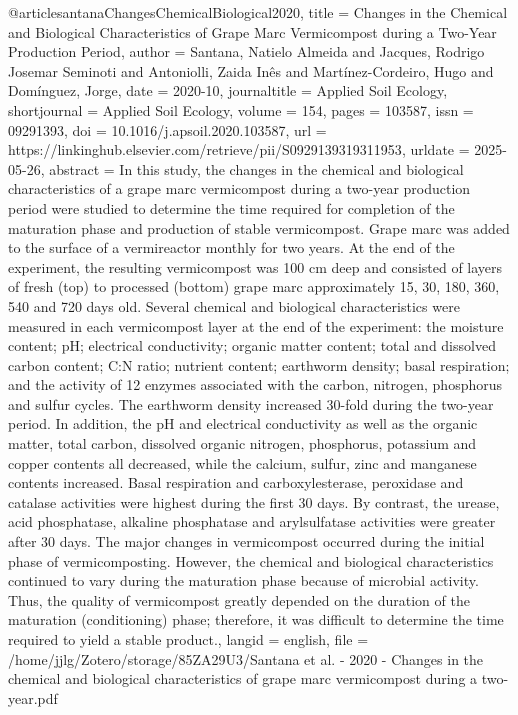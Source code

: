 {{{{@article{santanaChangesChemicalBiological2020,
  title = {Changes in the Chemical and Biological Characteristics of Grape Marc Vermicompost during a Two-Year Production Period},
  author = {Santana, Natielo Almeida and Jacques, Rodrigo Josemar Seminoti and Antoniolli, Zaida Inês and Martínez-Cordeiro, Hugo and Domínguez, Jorge},
  date = {2020-10},
  journaltitle = {Applied Soil Ecology},
  shortjournal = {Applied Soil Ecology},
  volume = {154},
  pages = {103587},
  issn = {09291393},
  doi = {10.1016/j.apsoil.2020.103587},
  url = {https://linkinghub.elsevier.com/retrieve/pii/S0929139319311953},
  urldate = {2025-05-26},
  abstract = {In this study, the changes in the chemical and biological characteristics of a grape marc vermicompost during a two-year production period were studied to determine the time required for completion of the maturation phase and production of stable vermicompost. Grape marc was added to the surface of a vermireactor monthly for two years. At the end of the experiment, the resulting vermicompost was 100 cm deep and consisted of layers of fresh (top) to processed (bottom) grape marc approximately 15, 30, 180, 360, 540 and 720 days old. Several chemical and biological characteristics were measured in each vermicompost layer at the end of the experiment: the moisture content; pH; electrical conductivity; organic matter content; total and dissolved carbon content; C:N ratio; nutrient content; earthworm density; basal respiration; and the activity of 12 enzymes associated with the carbon, nitrogen, phosphorus and sulfur cycles. The earthworm density increased 30-fold during the two-year period. In addition, the pH and electrical conductivity as well as the organic matter, total carbon, dissolved organic nitrogen, phosphorus, potassium and copper contents all decreased, while the calcium, sulfur, zinc and manganese contents increased. Basal respiration and carboxylesterase, peroxidase and catalase activities were highest during the first 30 days. By contrast, the urease, acid phosphatase, alkaline phosphatase and arylsulfatase activities were greater after 30 days. The major changes in vermicompost occurred during the initial phase of vermicomposting. However, the chemical and biological characteristics continued to vary during the maturation phase because of microbial activity. Thus, the quality of vermicompost greatly depended on the duration of the maturation (conditioning) phase; therefore, it was difficult to determine the time required to yield a stable product.},
  langid = {english},
  file = {/home/jjlg/Zotero/storage/85ZA29U3/Santana et al. - 2020 - Changes in the chemical and biological characteristics of grape marc vermicompost during a two-year.pdf}
}

}}}}
